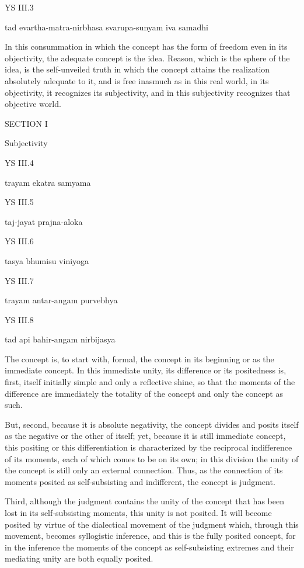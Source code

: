 YS III.3

    tad evartha-matra-nirbhasa svarupa-sunyam iva samadhi

In this consummation in which
the concept has the form of freedom
even in its objectivity,
the adequate concept is the idea.
Reason, which is the sphere of the idea,
is the self-unveiled truth
in which the concept attains
the realization absolutely adequate to it,
and is free inasmuch as in this real world,
in its objectivity, it recognizes its subjectivity,
and in this subjectivity recognizes that objective world.

SECTION I

Subjectivity

YS III.4

    trayam ekatra samyama

YS III.5

    taj-jayat prajna-aloka

YS III.6

    tasya bhumisu viniyoga

YS III.7

    trayam antar-angam purvebhya

YS III.8

    tad api bahir-angam nirbijasya

The concept is, to start with, formal,
the concept in its beginning
or as the immediate concept.
In this immediate unity,
its difference or its positedness
is, first, itself initially simple
and only a reflective shine,
so that the moments of the difference
are immediately the totality of the concept
and only the concept as such.

But, second, because it is absolute negativity,
the concept divides and posits itself
as the negative or the other of itself;
yet, because it is still immediate concept,
this positing or this differentiation is
characterized by the reciprocal
indifference of its moments,
each of which comes to be on its own;
in this division the unity of the concept is
still only an external connection.
Thus, as the connection of its moments
posited as self-subsisting and indifferent,
the concept is judgment.

Third, although the judgment contains
the unity of the concept that has been lost
in its self-subsisting moments,
this unity is not posited.
It will become posited by virtue of
the dialectical movement of the judgment
which, through this movement,
becomes syllogistic inference,
and this is the fully posited concept,
for in the inference the moments of
the concept as self-subsisting extremes
and their mediating unity are both equally posited.


